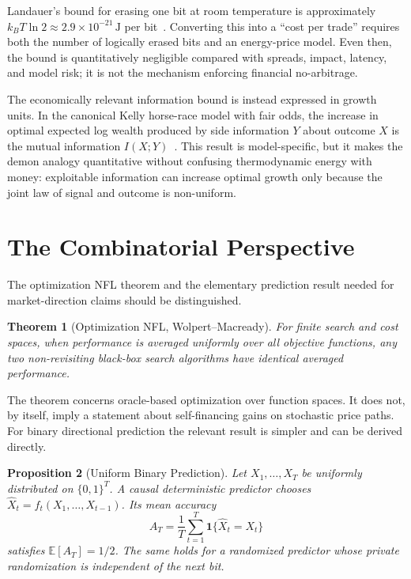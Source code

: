 \documentclass[aps,pra,reprint,superscriptaddress,amsmath,amssymb]{revtex4-2}
\theoremstyle{plain}
\newtheorem{theorem}{Theorem}
\newtheorem{proposition}[theorem]{Proposition}
\theoremstyle{definition}
\theoremstyle{remark}
\begin{document}
Landauer's bound for erasing one bit at room temperature is approximately
\(k_BT\ln2\approx2.9\times10^{-21}\,\mathrm{J}\)
per bit~\cite{landauer:61,bennett-82}. Converting this into a ``cost per
trade'' requires both the number of logically erased bits and an energy-price
model. Even then, the bound is quantitatively negligible compared with
spreads, impact, latency, and model risk; it is not the mechanism enforcing
financial no-arbitrage.

The economically relevant information bound is instead expressed in growth
units. In the canonical Kelly horse-race model with fair odds, the increase in
optimal expected log wealth produced by side information \(Y\) about outcome
\(X\) is the mutual information \(I(X;Y)\)~\cite{Kelly1956}. This result is
model-specific, but it makes the demon analogy quantitative without confusing
thermodynamic energy with money: exploitable information can increase optimal
growth only because the joint law of signal and outcome is non-uniform.

\section{The Combinatorial Perspective}
\label{sec:nfl}

The optimization NFL theorem and the elementary prediction result needed for
market-direction claims should be distinguished.

\begin{theorem}[Optimization NFL, Wolpert--Macready]
  \label{thm:nfl}
  For finite search and cost spaces, when performance is averaged uniformly
  over all objective functions, any two non-revisiting black-box search
  algorithms have identical averaged performance.
\end{theorem}

The theorem concerns oracle-based optimization over function spaces. It does
not, by itself, imply a statement about self-financing gains on stochastic
price paths. For binary directional prediction the relevant result is simpler
and can be derived directly.

\begin{proposition}[Uniform Binary Prediction]
  \label{prop:binary}
  Let \(X_1,\ldots,X_T\) be uniformly distributed on \(\{0,1\}^T\). A causal
  deterministic predictor chooses
  \(\widehat X_t=f_t(X_1,\ldots,X_{t-1})\). Its mean accuracy
  \[
    A_T=\frac1T\sum_{t=1}^T
      \mathbf{1}\{\widehat X_t=X_t\}
  \]
  satisfies \(\mathbb{E}[A_T]=1/2\). The same holds for a randomized predictor
  whose private randomization is independent of the next bit.
\end{proposition}
\end{document}
